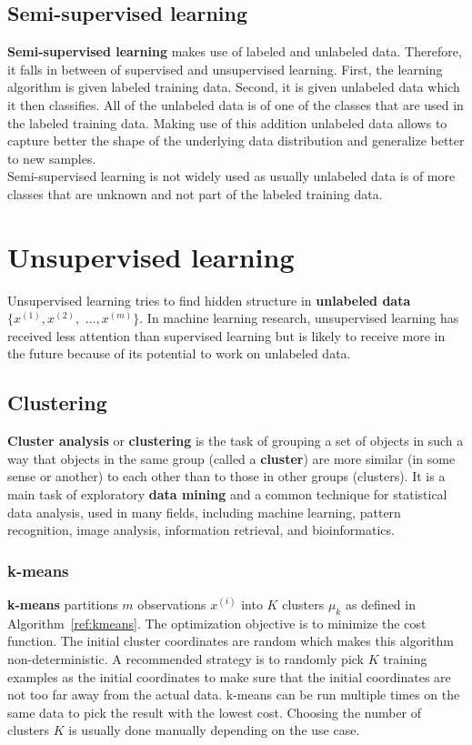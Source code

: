 \documentclass{report}
\begin{document}
\section{Semi-supervised learning}
{\bf Semi-supervised learning} makes use of labeled and unlabeled data.
Therefore, it falls in between of supervised and unsupervised learning.
First, the learning algorithm is given labeled training data. Second, it is given unlabeled data which it then classifies.
All of the unlabeled data is of one of the classes that are used in the labeled training data.
Making use of this addition unlabeled data allows to capture better the shape of the underlying data distribution and generalize better to new samples. \\
Semi-supervised learning is not widely used as usually unlabeled data is of more classes that are unknown and not part of the labeled training data.

\chapter{Unsupervised learning}
Unsupervised learning tries to find hidden structure in {\bf unlabeled data} $\{x^{(1)}, x^{(2)},$ $..., x^{(m)}\}$. In machine learning research, unsupervised learning has received less attention than supervised learning but is likely to receive more in the future because of its potential to work on unlabeled data.

\section{Clustering}
{\bf Cluster analysis} or {\bf clustering} is the task of grouping a set of objects in such a way that objects in the same group (called a {\bf cluster}) are more similar (in some sense or another) to each other than to those in other groups (clusters).
It is a main task of exploratory {\bf data mining} and a common technique for statistical data analysis, used in many fields, including machine learning, pattern recognition, image analysis, information retrieval, and bioinformatics.


\subsection{k-means}
{\bf k-means} partitions $m$ observations $x^{(i)}$ into $K$ clusters $\mu_k$ as defined in Algorithm~\ref{ref:kmeans}. The optimization objective is to minimize the cost function. The initial cluster coordinates are random which makes this algorithm non-deterministic. A recommended strategy is to randomly pick $K$ training examples as the initial coordinates to make sure that the initial coordinates are not too far away from the actual data. k-means can be run multiple times on the same data to pick the result with the lowest cost. Choosing the number of clusters $K$ is usually done manually depending on the use case.
\end{document}
